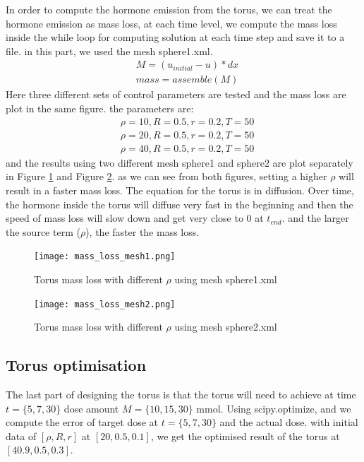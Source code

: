 \documentclass[12pt]{article}
\begin{document}
In order to compute the hormone emission from the torus, we can treat the hormone emission as mass loss, at each time level, we compute the mass loss inside the while loop for computing solution at each time step and save it to a file. in this part, we used the mesh sphere1.xml. 
\begin{align}
	&M = (u_{initial} - u)*dx\\
	&mass = assemble(M)
\end{align}
Here three different sets of control parameters are tested and the mass loss are plot in the same figure. the parameters are:
\begin{align}
	&\rho = 10, R = 0.5, r = 0.2, T = 50\\
	&\rho = 20, R = 0.5, r = 0.2, T = 50\\
	&\rho = 40, R = 0.5, r = 0.2, T = 50
\end{align}
and the results using two different mesh sphere1 and sphere2 are plot separately in Figure \ref{fig:mass_loss1} and Figure \ref{fig:mass_loss2}. as we can see from both figures, setting a higher $\rho$ will result in a faster mass loss. The equation for the torus is in diffusion. Over time, the hormone inside the torus will diffuse very fast in the beginning and then the speed of mass loss will slow down and get very close to 0 at $t_{end}$. and the larger the source term ($\rho$), the faster the mass loss.  
\begin{figure}[H] %
\centering
\texttt{[image: mass\_loss\_mesh1.png]}
\caption{Torus mass loss with different $\rho$ using mesh sphere1.xml}
\label{fig:mass_loss1}
\end{figure}

\begin{figure}[H] %
\centering
\texttt{[image: mass\_loss\_mesh2.png]}
\caption{Torus mass loss with different $\rho$ using mesh sphere2.xml}
\label{fig:mass_loss2}
\end{figure}
\newpage
\subsection{Torus optimisation}
The last part of designing the torus is that the torus will need to achieve at time $t = \{ 5, 7, 30\} $ dose amount $M = \{10, 15, 30 \}$ mmol. Using scipy.optimize, and we compute the error of target dose at $t = \{ 5, 7, 30\} $ and the actual dose. with initial data of $[\rho, R, r]$ at $[20, 0.5, 0.1]$, we get the optimised result of the torus at $[40.9, 0.5, 0.3]$. 
\\[1cm]
\end{document}
